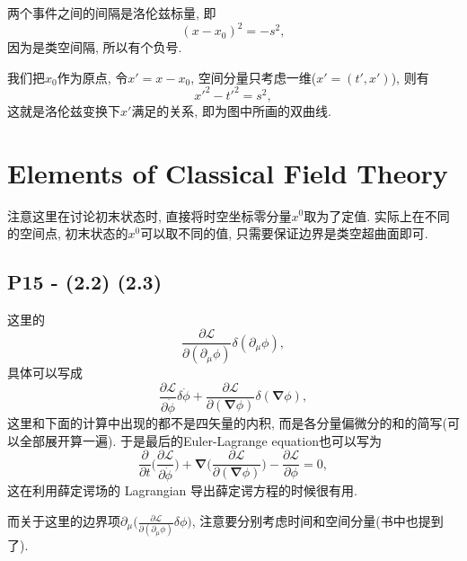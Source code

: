 两个事件之间的间隔是洛伦兹标量, 即
\begin{equation}
  (x-x_0)^2 = -s^2,
\end{equation}
因为是类空间隔, 所以有个负号.

我们把$x_0$作为原点, 令$x'=x-x_0$, 空间分量只考虑一维($x'=(t',x')$), 则有
\begin{equation}
  x'^2-t'^2=s^2,
\end{equation}
这就是洛伦兹变换下$x'$满足的关系, 即为图中所画的双曲线.

\section{Elements of Classical Field Theory}

注意这里在讨论初末状态时, 直接将时空坐标零分量$x^0$取为了定值.
实际上在不同的空间点, 初末状态的$x^0$可以取不同的值, 只需要保证边界是类空超曲面即可.


\subsection{P15 - (2.2) (2.3)}

这里的
\begin{equation}
  \frac{\partial \mathcal{L}}{\partial(\partial_\mu \phi)}\delta(\partial_\mu \phi),
\end{equation}
具体可以写成
\begin{equation}
  \frac{\partial \mathcal{L}}{\partial\dot\phi}\delta  \dot{\phi}+\frac{\partial \mathcal{L}}{\partial(\bm{\nabla} \phi)}\delta(\bm{\nabla} \phi),
\end{equation}
这里和下面的计算中出现的都不是四矢量的内积, 而是各分量偏微分的和的简写(可以全部展开算一遍).
于是最后的Euler-Lagrange equation也可以写为
\begin{equation}
  \frac{\partial}{\partial t}\biggl(\frac{\partial \mathcal{L}}{\partial\dot\phi}\biggr) + \bm{\nabla} \biggl(\frac{\partial \mathcal{L}}{\partial(\bm{\nabla} \phi)}\biggr) - \frac{\partial \mathcal{L}}{\partial \phi} = 0,
\end{equation}
这在利用薛定谔场的 Lagrangian 导出薛定谔方程的时候很有用.

而关于这里的边界项$\partial_\mu \bigl(\frac{\partial \mathcal{L}}{\partial(\partial_\mu \phi)}\delta \phi \bigr)$, 注意要分别考虑时间和空间分量(书中也提到了).

